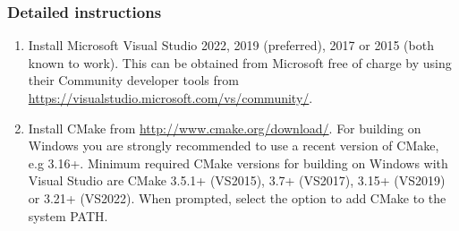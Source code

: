 \subsubsection{Detailed instructions}

\begin{enumerate}
  \item Install Microsoft Visual Studio 2022, 2019 (preferred), 2017 or 2015 (both
  known to work). This can be obtained from Microsoft free of charge by using
  their Community developer tools from
  \url{https://visualstudio.microsoft.com/vs/community/}.

  \item Install CMake from \url{http://www.cmake.org/download/}. For building
  on Windows you are strongly recommended to use a recent version of CMake,
  e.g 3.16+. Minimum required CMake versions for building \nekpp on Windows
  with Visual Studio are CMake 3.5.1+ (VS2015), 3.7+ (VS2017), 3.15+
  (VS2019) or 3.21+ (VS2022). When prompted, select the option to add CMake to the system PATH.


\end{enumerate}
